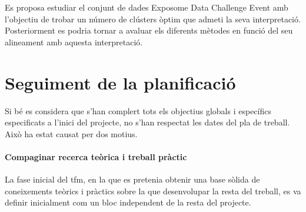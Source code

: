 \documentclass[CAT,BIB]{TFUOC}%
\begin{document}
            Es proposa estudiar el conjunt de dades Exposome Data Challenge Event
            amb l'objectiu de trobar un número de clústers òptim
            que admeti la seva interpretació.
            Posteriorment es podria tornar a avaluar els diferents mètodes
            en funció del seu alineament amb aquesta interpretació.


    \section{Seguiment de la planificació}
    \label{s:seguiment}


        Si bé es considera que s'han complert tots els objectius
        globals i específics
        especificats a l'inici del projecte,
        no s'han respectat les dates del pla de treball.
        Això ha estat causat per dos motius.

        \paragraph{Compaginar recerca teòrica i treball pràctic}
            La fase inicial del \gls{tfm},
            en la que es pretenia obtenir una base sòlida de coneixements
            teòrics i pràctics
            sobre la que desenvolupar la resta del treball,
            es va definir inicialment com un bloc
            independent de la resta del projecte.
\end{document}
